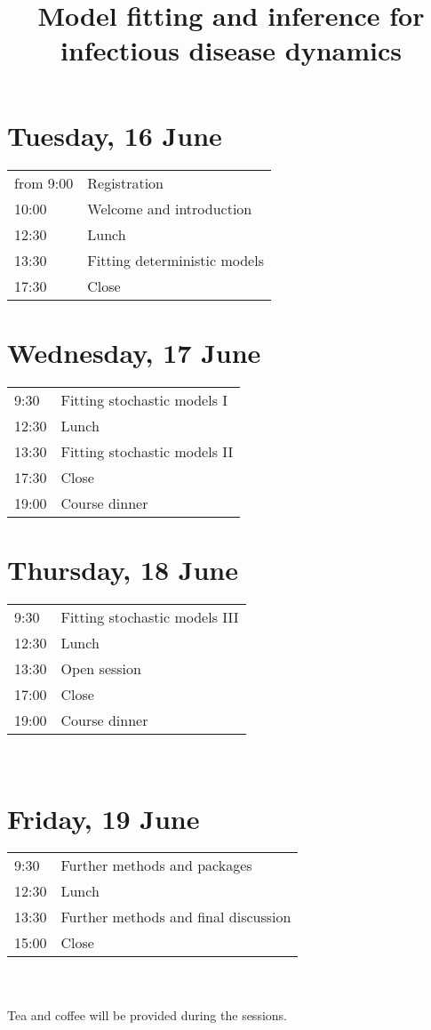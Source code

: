 \documentclass[a4paper]{article}
\title{Model fitting and inference for\\infectious disease dynamics}
\author{}
\date{}
\begin{document}
\maketitle

\section*{Tuesday, 16 June}
\label{sec:tuesday}

\begin{tabular}{R{1.5cm} l}
from 9:00 & Registration\\
10:00 & Welcome and introduction\\
12:30 & Lunch\\
13:30 & Fitting deterministic models\\
17:30 & Close\\
\end{tabular}

\section*{Wednesday, 17 June}
\label{sec:wednesday}
\begin{tabular}{R{1.5cm} l}
9:30 & Fitting stochastic models I\\
12:30 & Lunch\\
13:30 & Fitting stochastic models II\\
17:30 & Close\\
19:00 & Course dinner\\
\end{tabular}

\section*{Thursday, 18 June}
\label{sec:thursday}
\begin{tabular}{R{1.5cm} l}
9:30 & Fitting stochastic models III\\
12:30 & Lunch\\
13:30 & Open session\\
17:00 & Close\\
19:00 & Course dinner
\end{tabular}\\

\section*{Friday, 19 June}
\label{sec:thursday}
\begin{tabular}{R{1.5cm} l}
9:30 & Further methods and packages\\
12:30 & Lunch\\
13:30 & Further methods and final discussion\\
15:00 & Close\\
\end{tabular}\\
\vspace{0.5cm}\\
Tea and coffee will be provided during the sessions.
\end{document}
